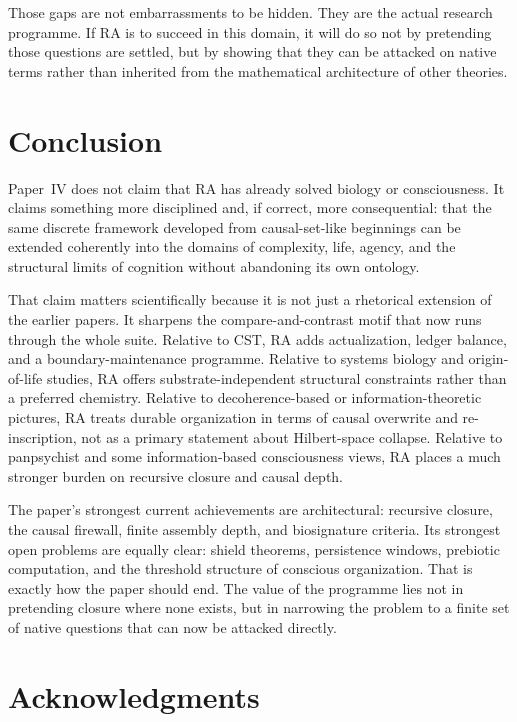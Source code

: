 \documentclass[11pt]{article}
\begin{document}
Those gaps are not embarrassments to be hidden. They are the actual research programme. If RA is to succeed in this domain, it will do so not by pretending those questions are settled, but by showing that they can be attacked on native terms rather than inherited from the mathematical architecture of other theories.

\section{Conclusion}
\label{sec:conclusion}

Paper~IV does not claim that RA has already solved biology or consciousness. It claims something more disciplined and, if correct, more consequential: that the same discrete framework developed from causal-set-like beginnings can be extended coherently into the domains of complexity, life, agency, and the structural limits of cognition without abandoning its own ontology.

That claim matters scientifically because it is not just a rhetorical extension of the earlier papers. It sharpens the compare-and-contrast motif that now runs through the whole suite. Relative to CST, RA adds actualization, ledger balance, and a boundary-maintenance programme. Relative to systems biology and origin-of-life studies, RA offers substrate-independent structural constraints rather than a preferred chemistry. Relative to decoherence-based or information-theoretic pictures, RA treats durable organization in terms of causal overwrite and re-inscription, not as a primary statement about Hilbert-space collapse. Relative to panpsychist and some information-based consciousness views, RA places a much stronger burden on recursive closure and causal depth.

The paper's strongest current achievements are architectural: recursive closure, the causal firewall, finite assembly depth, and biosignature criteria. Its strongest open problems are equally clear: shield theorems, persistence windows, prebiotic computation, and the threshold structure of conscious organization. That is exactly how the paper should end. The value of the programme lies not in pretending closure where none exists, but in narrowing the problem to a finite set of native questions that can now be attacked directly.

\section*{Acknowledgments}
\end{document}
